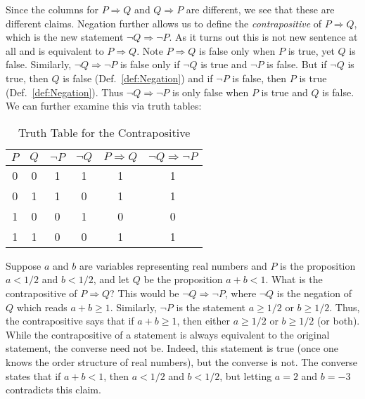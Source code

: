         Since the columns for $P\Rightarrow{Q}$ and $Q\Rightarrow{P}$ are
        different, we see that these are different claims. Negation further
        allows us to define the \textit{contrapositive} of
        $P\Rightarrow{Q}$, which is the new statement
        $\neg{Q}\Rightarrow\neg{P}$. As it turns out this is not new
        sentence at all and is equivalent to $P\Rightarrow{Q}$. Note
        $P\Rightarrow{Q}$ is false only when $P$ is true, yet $Q$ is false.
        Similarly, $\neg{Q}\Rightarrow\neg{P}$ is false only if $\neg{Q}$ is
        true and $\neg{P}$ is false. But if $\neg{Q}$ is true, then $Q$ is
        false (Def.~\ref{def:Negation}) and if $\neg{P}$ is false, then $P$ is
        true (Def.~\ref{def:Negation}). Thus $\neg{Q}\Rightarrow\neg{P}$ is only
        false when $P$ is true and $Q$ is false. We can further examine this via
        truth tables:
        \begin{table}[H]
            \centering
            \captionsetup{type=table}
            \begin{tabular}{c|c|c|c|c|c}
                $P$&$Q$&$\neg{P}$&$\neg{Q}$&$P\Rightarrow{Q}$
                    &$\neg{Q}\Rightarrow\neg{P}$\\
                \hline
                0&0&1&1&1&1\\
                0&1&1&0&1&1\\
                1&0&0&1&0&0\\
                1&1&0&0&1&1
            \end{tabular}
            \caption{Truth Table for the Contrapositive}
            \label{tab:Truth_Table_for_Contrapositive}
        \end{table}
        \begin{example}
            Suppose $a$ and $b$ are variables representing real numbers and $P$
            is the proposition $a<1/2$ and $b<1/2$, and let $Q$ be the
            proposition $a+b<1$. What is the contrapositive of
            $P\Rightarrow{Q}$? This would be $\neg{Q}\Rightarrow\neg{P}$, where
            $\neg{Q}$ is the negation of $Q$ which reads $a+b\geq{1}$.
            Similarly, $\neg{P}$ is the statement $a\geq{1}/2$ or $b\geq{1}/2$.
            Thus, the contrapositive says that if $a+b\geq{1}$, then either
            $a\geq{1}/2$ or $b\geq{1}/2$ (or both). While the contrapositive of
            a statement is always equivalent to the original statement, the
            converse need not be. Indeed, this statement is true (once one knows
            the order structure of real numbers), but the converse is not. The
            converse states that if $a+b<1$, then $a<1/2$ and $b<1/2$, but
            letting $a=2$ and $b=\minus{3}$ contradicts this claim.
        \end{example}
